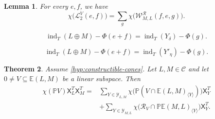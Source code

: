 \documentclass[10pt,a4paper]{amsart}
\numberwithin{equation}{section}
\newtheorem{theorem}{Theorem}[section]
\newtheorem{lemma}[theorem]{Lemma}
\theoremstyle{definition}
\DeclareMathOperator{\ind}{ind}
\newcommand{\C}{\mathcal C}
\newcommand{\E}{\mathbb E}
\newcommand{\X}{\mathsf X}
\begin{document}
\setcounter{section}{3}
\setcounter{equation}{5}
\setcounter{theorem}{6}
\begin{lemma}\label{lem:complement}
For every $e,f$, we have
\[
 \chi\bigl(\mathcal L^V_2(e,f)\bigr)
 =\sum_g\chi\bigl(\mathcal W^{\mathcal R}_{M,L}(f,e,g)\bigr).
\]
\end{lemma}

\setcounter{section}{3}
\setcounter{equation}{5}
\setcounter{theorem}{8}
\begin{equation}\label{eq:forward-exponent}
 \ind_T(L\oplus M)-\Phi(e+f)
 =\ind_T(Y_\delta)-\Phi(g).
\end{equation}

\setcounter{section}{3}
\setcounter{equation}{6}
\setcounter{theorem}{8}
\begin{equation}\label{eq:reverse-exponent}
 \ind_T(L\oplus M)-\Phi(e+f)
 =\ind_T(Y'_\eta)-\Phi(g).
\end{equation}

\setcounter{section}{3}
\setcounter{equation}{7}
\setcounter{theorem}{8}
\begin{theorem}\label{thm:main}
Assume \cref{hyp:constructible-cones}.  Let $L,M\in\C$ and let
$0\neq V\subseteq\E(L,M)$ be a linear subspace.  Then
\begin{equation}\label{eq:main}
\begin{aligned}
 \chi(\mathbb PV)\X^T_L\X^T_M
 ={}&\sum_{Y\in\mathcal Y_{L,M}}
 \chi\bigl(\mathbb P(V\cap\E(L,M)_{\langle Y\rangle})\bigr)\X^T_Y\\
 &+\sum_{Y\in\mathcal Y_{M,L}}
 \chi\bigl(\mathcal R_V\cap
   \mathbb P\E(M,L)_{\langle Y\rangle}\bigr)\X^T_Y.
\end{aligned}
\end{equation}
\end{theorem}
\end{document}
